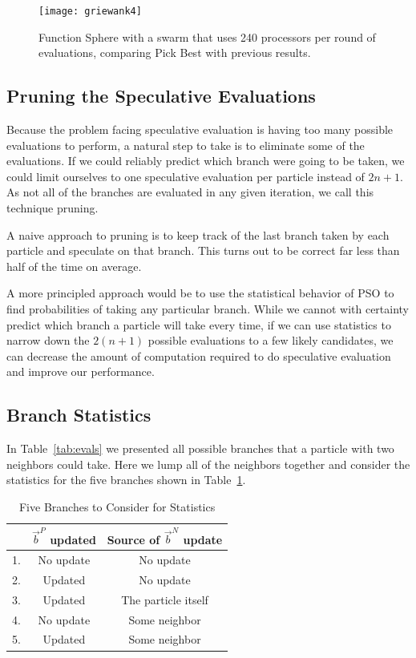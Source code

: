 \documentclass[journal,letterpaper]{IEEEtran}
\providecommand{\pers}{\ensuremath{P}}
\providecommand{\neigh}{\ensuremath{N}}
\providecommand{\nbest}{\ensuremath{\Vec{b}^\neigh}}
\providecommand{\pbest}{\ensuremath{\Vec{b}^\pers}}
\begin{document}
\begin{figure}
  \centering
  \texttt{[image: griewank4]}
  \caption{Function Sphere with a swarm that uses 240 processors per round of
  evaluations, comparing Pick Best with previous results.}
  \label{fig:griewank-pickbest}
\end{figure}

\subsection{Pruning the Speculative Evaluations}
\label{sec:pruning}

Because the problem facing speculative evaluation is having too many possible
evaluations to perform, a natural step to take is to eliminate some of the
evaluations.  If we could reliably predict which branch were going to be taken,
we could limit ourselves to one speculative evaluation per particle instead of
$2n+1$.  As not all of the branches are evaluated in any given iteration, we
call this technique pruning.  

A naive approach to pruning is to keep track of the last branch taken by each
particle and speculate on that branch.  This turns out to be correct far less
than half of the time on average.

A more principled approach would be to use the statistical behavior of PSO to
find probabilities of taking any particular branch.  While we cannot with
certainty predict which branch a particle will take every time, if we can use
statistics to narrow down the $2(n+1)$ possible evaluations to a few likely
candidates, we can decrease the amount of computation required to do
speculative evaluation and improve our performance.

\subsection{Branch Statistics}

In Table~\ref{tab:evals} we presented all possible branches that a particle
with two neighbors could take.  Here we lump all of the neighbors together and
consider the statistics for the five branches shown in Table~\ref{tab:branches}.

\begin{table}[ht]
  \caption{Five Branches to Consider for Statistics}
  \label{tab:branches}
  \centering
  \begin{tabular}{rc|c}
	&$\pbest$ updated&Source of $\nbest$ update\\
	\hline
	1.&No update&No update\\
	2.&Updated&No update\\
	3.&Updated&The particle itself\\
	4.&No update&Some neighbor\\
	5.&Updated&Some neighbor\\
  \end{tabular}
\end{table}
\end{document}
